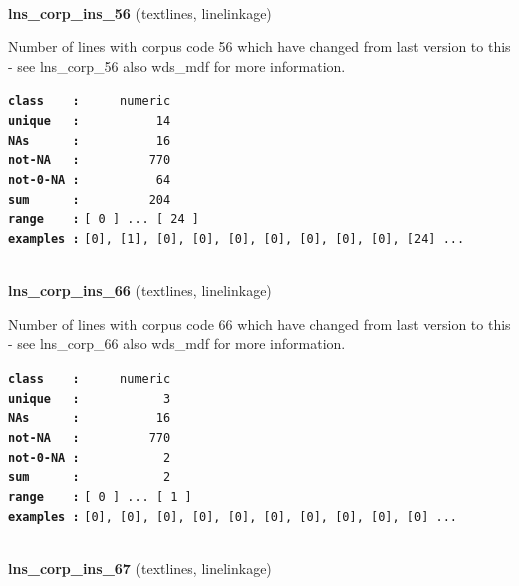 \documentclass[]{article}
\begin{document}
~

\textbf{lns\_corp\_ins\_56} (textlines, linelinkage)

Number of lines with corpus code 56 which have changed from last version
to this - see lns\_corp\_56 also wds\_mdf for more information.

\textbf{\texttt{class\ \ \ \ :}} \texttt{~~~~~numeric}\\
\textbf{\texttt{unique\ \ \ :}} \texttt{~~~~~~~~~~14}\\
\textbf{\texttt{NAs\ \ \ \ \ \ :}} \texttt{~~~~~~~~~~16}\\
\textbf{\texttt{not-NA\ \ \ :}} \texttt{~~~~~~~~~770}\\
\textbf{\texttt{not-0-NA\ :}} \texttt{~~~~~~~~~~64}\\
\textbf{\texttt{sum\ \ \ \ \ \ :}} \texttt{~~~~~~~~~204}\\
\textbf{\texttt{range\ \ \ \ :}}
\texttt{{[}\ 0\ {]}\ ...\ {[}\ 24\ {]}}\\
\textbf{\texttt{examples\ :}}
\texttt{{[}0{]},\ {[}1{]},\ {[}0{]},\ {[}0{]},\ {[}0{]},\ {[}0{]},\ {[}0{]},\ {[}0{]},\ {[}0{]},\ {[}24{]}\ ...}\\

~

\textbf{lns\_corp\_ins\_66} (textlines, linelinkage)

Number of lines with corpus code 66 which have changed from last version
to this - see lns\_corp\_66 also wds\_mdf for more information.

\textbf{\texttt{class\ \ \ \ :}} \texttt{~~~~~numeric}\\
\textbf{\texttt{unique\ \ \ :}} \texttt{~~~~~~~~~~~3}\\
\textbf{\texttt{NAs\ \ \ \ \ \ :}} \texttt{~~~~~~~~~~16}\\
\textbf{\texttt{not-NA\ \ \ :}} \texttt{~~~~~~~~~770}\\
\textbf{\texttt{not-0-NA\ :}} \texttt{~~~~~~~~~~~2}\\
\textbf{\texttt{sum\ \ \ \ \ \ :}} \texttt{~~~~~~~~~~~2}\\
\textbf{\texttt{range\ \ \ \ :}}
\texttt{{[}\ 0\ {]}\ ...\ {[}\ 1\ {]}}\\
\textbf{\texttt{examples\ :}}
\texttt{{[}0{]},\ {[}0{]},\ {[}0{]},\ {[}0{]},\ {[}0{]},\ {[}0{]},\ {[}0{]},\ {[}0{]},\ {[}0{]},\ {[}0{]}\ ...}\\

~

\textbf{lns\_corp\_ins\_67} (textlines, linelinkage)
\end{document}

